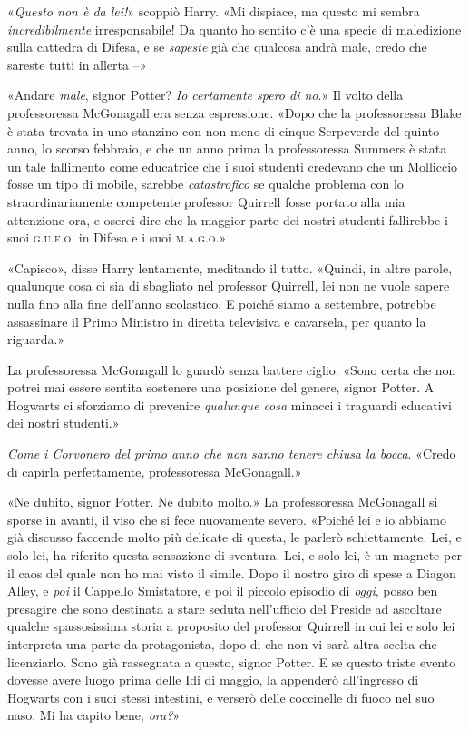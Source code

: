 «\textit{Questo non è da lei!}» scoppiò Harry. «Mi dispiace, ma questo mi sembra \textit{incredibilmente} irresponsabile! Da quanto ho sentito c’è una specie di maledizione sulla cattedra di Difesa, e se \textit{sapeste} già che qualcosa andrà male, credo che sareste tutti in allerta –»

«Andare \textit{male}, signor Potter? \textit{Io certamente spero di no}.» Il volto della professoressa McGonagall era senza espressione. «Dopo che la professoressa Blake è stata trovata in uno stanzino con non meno di cinque Serpeverde del quinto anno, lo scorso febbraio, e che un anno prima la professoressa Summers è stata un tale fallimento come educatrice che i suoi studenti credevano che un Molliccio fosse un tipo di mobile, sarebbe \textit{catastrofico} se qualche problema con lo straordinariamente competente professor Quirrell fosse portato alla mia attenzione ora, e oserei dire che la maggior parte dei nostri studenti fallirebbe i suoi \textsc{g.u.f.o}. in Difesa e i suoi \textsc{m.a.g.o.}»

«Capisco», disse Harry lentamente, meditando il tutto. «Quindi, in altre parole, qualunque cosa ci sia di sbagliato nel professor Quirrell, lei non ne vuole sapere nulla fino alla fine dell’anno scolastico. E poiché siamo a settembre, potrebbe assassinare il Primo Ministro in diretta televisiva e cavarsela, per quanto la riguarda.»

La professoressa McGonagall lo guardò senza battere ciglio. «Sono certa che non potrei mai essere sentita sostenere una posizione del genere, signor Potter. A Hogwarts ci sforziamo di prevenire \textit{qualunque cosa} minacci i traguardi educativi dei nostri studenti.»

\textit{Come i Corvonero del primo anno che non sanno tenere chiusa la bocca}. «Credo di capirla perfettamente, professoressa McGonagall.»

«Ne dubito, signor Potter. Ne dubito molto.» La professoressa McGonagall si sporse in avanti, il viso che si fece nuovamente severo. «Poiché lei e io abbiamo già discusso faccende molto più delicate di questa, le parlerò schiettamente. Lei, e solo lei, ha riferito questa sensazione di sventura. Lei, e solo lei, è un magnete per il caos del quale non ho mai visto il simile. Dopo il nostro giro di spese a Diagon Alley, e \textit{poi} il Cappello Smistatore, e poi il piccolo episodio di \textit{oggi}, posso ben presagire che sono destinata a stare seduta nell’ufficio del Preside ad ascoltare qualche spassosissima storia a proposito del professor Quirrell in cui lei e solo lei interpreta una parte da protagonista, dopo di che non vi sarà altra scelta che licenziarlo. Sono già rassegnata a questo, signor Potter. E se questo triste evento dovesse avere luogo prima delle Idi di maggio, la appenderò all’ingresso di Hogwarts con i suoi stessi intestini, e verserò delle coccinelle di fuoco nel suo naso. Mi ha capito bene, \textit{ora?}»

